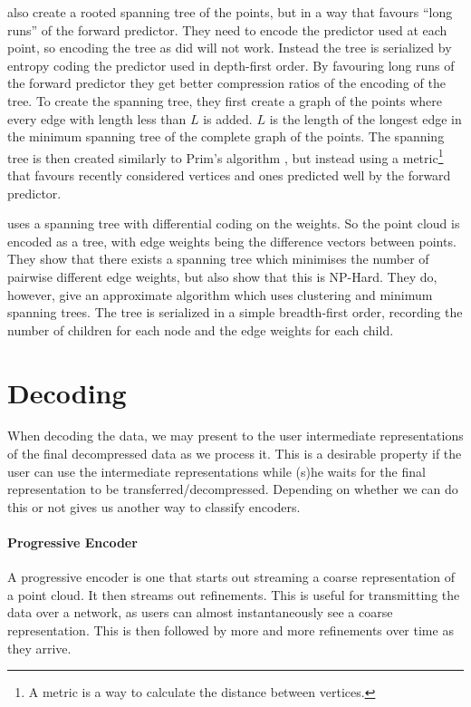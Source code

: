 \documentclass[a4paper]{report}
\begin{document}
\citet{merrycomp} also create a rooted spanning tree of the points, but in a
way that favours ``long runs'' of the forward predictor. They need to encode
the predictor used at each point, so encoding the tree as \citet{gumholdcomp}
did will not work. Instead the tree is serialized by entropy coding the
predictor used in depth-first order. By favouring long runs of the forward
predictor they get better compression ratios of the encoding of the tree. To
create the spanning tree, they first create a graph of the points where every
edge with length less than $L$ is added. $L$ is the length of the longest edge
in the minimum spanning tree of the complete graph of the points. The spanning
tree is then created similarly to Prim's algorithm \citep[p.\ 457]{sedgewick},
but instead using a metric\footnote{A metric is a way to calculate the
  distance between vertices.} that favours recently considered vertices and
ones predicted well by the forward predictor.

\citet{chen2005lcp} uses a spanning tree with differential coding on the
weights. So the point cloud is encoded as a tree, with edge weights being the
difference vectors between points. They show that there exists a spanning tree
which minimises the number of pairwise different edge weights, but also show
that this is NP-Hard. They do, however, give an approximate algorithm which
uses clustering and minimum spanning trees. The tree is serialized in a simple
breadth-first order, recording the number of children for each node and the
edge weights for each child.


\section{Decoding}

When decoding the data, we may present to the user intermediate
representations of the final decompressed data as we process it. This is a
desirable property if the user can use the intermediate representations while
(s)he waits for the final representation to be
transferred/decompressed. Depending on whether we can do this or not gives us
another way to classify encoders.

\paragraph{Progressive Encoder}
A progressive encoder is one that starts out streaming a coarse representation
of a point cloud. It then streams out refinements. This is useful for
transmitting the data over a network, as users can almost instantaneously see
a coarse representation. This is then followed by more and more refinements
over time as they arrive.
\end{document}
